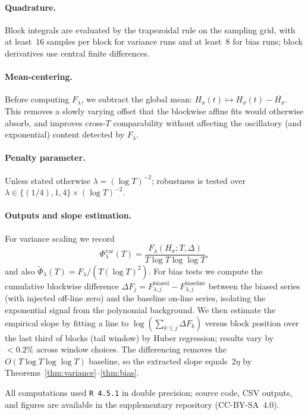 \paragraph{Quadrature.}
Block integrals are evaluated by the trapezoidal rule on the sampling
grid, with at least~$16$ samples per block for variance runs
and at least~$8$ for bias runs; block derivatives use central finite
differences.

\paragraph{Mean-centering.}
Before computing $F_\lambda$, we subtract the global mean:
$H_\sigma(t)\mapsto H_\sigma(t)-\overline{H_\sigma}$.
This removes a slowly varying offset that the blockwise affine fits
would otherwise absorb, and improves cross-$T$ comparability without
affecting the oscillatory (and exponential) content detected by $F_\lambda$.

\paragraph{Penalty parameter.}
Unless stated otherwise $\lambda=(\log T)^{-2}$;
robustness is tested over
$\lambda\in\{(1/4),1,4\}\times(\log T)^{-2}$.

\paragraph{Outputs and slope estimation.}
For variance scaling we record
\[
\Phi_\lambda^{\mathrm{var}}(T)
  = \frac{F_\lambda(H_\sigma;T,\Delta)}{T\log T\log\log T},
\label{eq:Phi-var}
\]
and also $\widetilde\Phi_\lambda(T)=F_\lambda/(T(\log T)^2)$.
For bias tests we compute the cumulative blockwise difference
$\Delta F_j = F_{\lambda,j}^{\mathrm{biased}} - F_{\lambda,j}^{\mathrm{baseline}}$
between the biased series (with injected off-line zero) and the
baseline on-line series, isolating the exponential signal from the
polynomial background.
We then estimate the empirical slope by fitting a line to
$\log(\sum_{k\le j}\Delta F_k)$ versus block position over the
last third of blocks (tail window) by Huber regression;
results vary by $<0.2\%$ across window choices.
The differencing removes the $O(T\log T\log\log T)$ baseline,
so the extracted slope equals~$2\eta$ by
Theorems~\ref{thm:variance}--\ref{thm:bias}.

All computations used \texttt{R~4.5.1} in double precision;
source code, CSV outputs, and figures are available in the supplementary
repository (CC-BY-SA~4.0).

